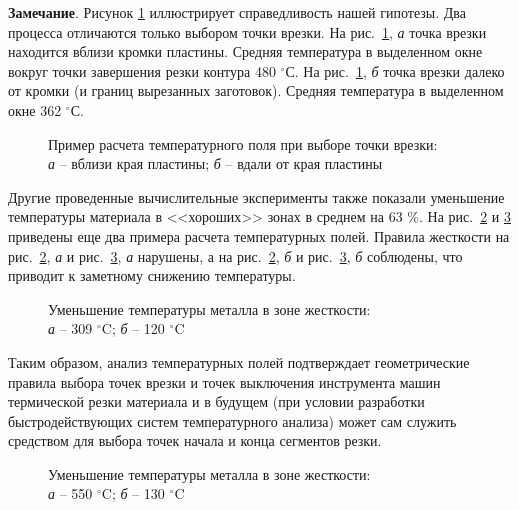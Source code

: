 {\bf Замечание}.
Рисунок \ref{thermal-field}
иллюстрирует справедливость нашей гипотезы.
Два процесса отличаются только выбором точки врезки.
На рис.~\ref{thermal-field}, {\it а}
точка врезки находится вблизи кромки пластины.
Средняя температура в выделенном окне
вокруг точки завершения резки контура 480 $^\circ$С.
На рис.~\ref{thermal-field}, {\it б} точка врезки далеко от кромки
(и границ вырезанных заготовок).
Средняя температура в выделенном окне  362 $^\circ$С.

\begin{figure}[p]
  \centering
  \caption{
    Пример расчета температурного поля при выборе точки врезки: \\
    {\it а} -- вблизи края пластины;
    {\it б} -- вдали от края пластины
  }
  \label{thermal-field}
\end{figure}

Другие проведенные вычислительные эксперименты
также показали уменьшение температуры материала
в <<хороших>> зонах в среднем на 63 \%.
На рис.~\ref{thermal-309-120}
и \ref{thermal-550-130}
приведены еще два примера расчета температурных полей.
Правила жесткости на рис.~\ref{thermal-309-120}, {\it а}
и рис.~\ref{thermal-550-130}, {\it а}
нарушены,
а на
рис.~\ref{thermal-309-120}, {\it б}
и рис.~\ref{thermal-550-130}, {\it б}
соблюдены,
что приводит к заметному снижению
температуры.

\begin{figure}[p]
  \centering
  \caption{
    Уменьшение температуры металла в зоне жесткости: \\
    {\it а} -- 309 $^\circ$C;
    {\it б} -- 120 $^\circ$C
  }
  \label{thermal-309-120}
\end{figure}

Таким образом,
анализ температурных полей подтверждает
геометрические правила выбора точек врезки
и точек выключения инструмента машин термической
резки материала и в будущем
(при условии разработки быстродействующих систем температурного анализа)
может сам служить средством для выбора точек начала и конца сегментов резки.

\begin{figure}[p]
  \centering
  \caption{
    Уменьшение температуры металла в зоне жесткости: \\
    {\it а} -- 550 $^\circ$C;
    {\it б} -- 130 $^\circ$C
    }
  \label{thermal-550-130}
\end{figure}

